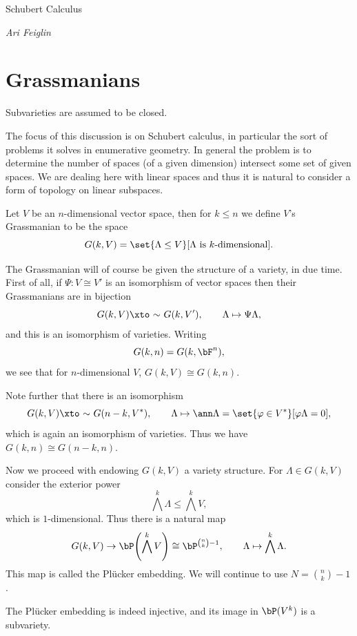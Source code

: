 
\def\@cntrprefix{\the\counter{section}.}

\centerline{Schubert Calculus}
\smallskip
\centerline{\it Ari Feiglin}

\section{Grassmanians}

\bnote

    Subvarieties are assumed to be closed.

\enote

The focus of this discussion is on Schubert calculus, in particular the sort of problems it solves in
enumerative geometry.
In general the problem is to determine the number of spaces (of a given dimension) intersect some set
of given spaces.
We are dealing here with linear spaces and thus it is natural to consider a form of topology on linear
subspaces.

\bdefn

    Let $V$ be an $n$-dimensional vector space, then for $k\leq n$ we define $V$'s {\emphcolor Grassmanian}
    to be the space
    $$ G(k,V) = \set{\Lambda\leq V}[\hbox{$\Lambda$ is $k$-dimensional}] . $$

\edefn

The Grassmanian will of course be given the structure of a variety, in due time.
First of all, if $\Psi\colon V\cong V'$ is an isomorphism of vector spaces then their Grassmanians are in
bijection
$$ G(k,V) \lisoto G(k,V'),\qquad \Lambda\mapsto\Psi\Lambda , $$
and this is an isomorphism of varieties.
Writing
$$ G(k,n) = G(k,\bF^n) , $$
we see that for $n$-dimensional $V$, $G(k,V)\cong G(k,n)$.

Note further that there is an isomorphism
$$ G(k,V) \lisoto G(n-k,V^*),\qquad \Lambda\mapsto\ann\Lambda = \set{\phi\in V^*}[\phi\Lambda=0] , $$
which is again an isomorphism of varieties.
Thus we have $G(k,n)\cong G(n-k,n)$.

Now we proceed with endowing $G(k,V)$ a variety structure.
For $\Lambda\in G(k,V)$ consider the exterior power
$$ \bigwedge^k\Lambda \leq \bigwedge^kV , $$
which is $1$-dimensional.
Thus there is a natural map
$$ G(k,V) \to \bP\parens{\bigwedge^kV} \cong \bP^{\binom nk-1},\qquad \Lambda \mapsto \bigwedge^k\Lambda . $$
This map is called the {\emphcolor Pl\"ucker embedding}.
We will continue to use $N=\binom nk-1$.

\blemm

    The Pl\"ucker embedding is indeed injective, and its image in $\bP(V^k)$ is a subvariety.

